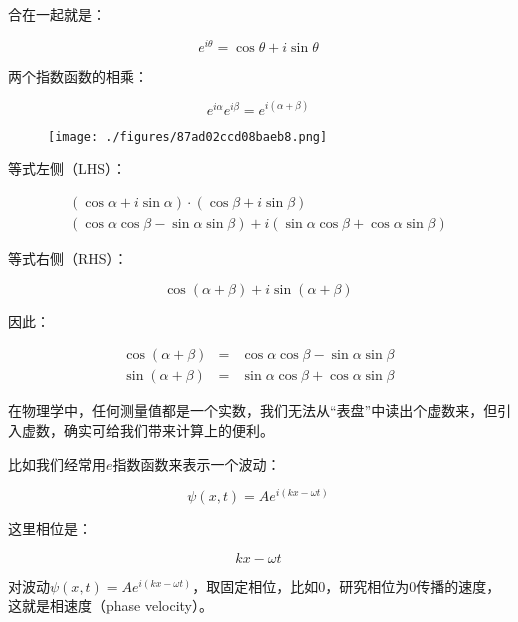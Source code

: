 合在一起就是：

\begin{equation}
e^{i \theta} = \cos \theta + i \sin \theta~
\end{equation}

两个指数函数的相乘：

\begin{equation}
e^{i \alpha} e^{i \beta} = e^{i (\alpha + \beta)}~
\end{equation}

\begin{figure}[ht]
\centering
\texttt{[image: ./figures/87ad02ccd08baeb8.png]}
\caption\label{fig_QMPre6_3}
\end{figure}

等式左侧（LHS）：

\begin{align}
(\cos \alpha + i \sin \alpha) \cdot (\cos \beta + i \sin \beta)  \\
 (\cos \alpha \cos \beta - \sin \alpha \sin \beta ) + i ( \sin \alpha \cos \beta + \cos \alpha \sin \beta)~
\end{align}

等式右侧（RHS）：

\begin{equation}
\cos (\alpha + \beta) + i \sin (\alpha + \beta)~
\end{equation}

因此：

\begin{align}
\cos (\alpha + \beta) &=& \cos \alpha \cos \beta - \sin \alpha \sin \beta\\
\sin (\alpha + \beta)&=& \sin \alpha \cos \beta + \cos \alpha \sin \beta~
\end{align}

在物理学中，任何测量值都是一个实数，我们无法从“表盘”中读出个虚数来，但引入虚数，确实可给我们带来计算上的便利。

比如我们经常用$e$指数函数来表示一个波动：

\begin{equation}
\psi (x,t) = A e^{i (kx - \omega t)}~
\end{equation}

这里相位是：

\begin{equation}
k x - \omega t~
\end{equation}

对波动$\psi(x,t) =  A e^{i (kx - \omega t)} $，取固定相位，比如0，研究相位为0传播的速度，这就是相速度（phase velocity）。

